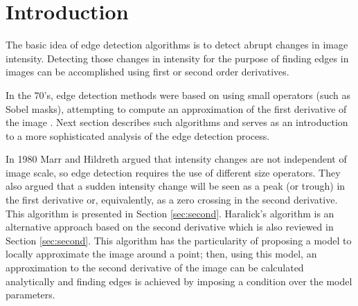 \documentclass{ipol}
\numberwithin{equation}{section}
\numberwithin{table}{section}
\begin{document}




\section{Introduction}
\label{sec:intro}

The basic idea of edge detection algorithms is to detect abrupt changes in image intensity. 
Detecting those changes in intensity for the purpose of finding edges in images 
can be accomplished using first or second order derivatives. 

In the 70's, edge detection methods were based on using small operators 
(such as Sobel masks), attempting to compute an approximation of the
first derivative of the image \cite{Gonzalez2007Digital}. Next section describes such algorithms and serves as an introduction to a more sophisticated analysis of the edge detection process.

In 1980 Marr and Hildreth \cite{AIM-518} argued that intensity changes are not independent 
of image scale, so edge detection requires the use of different size 
operators. They also argued that a sudden intensity change will be seen 
as a peak (or trough) in the first derivative or, equivalently, as a zero 
crossing in the second derivative. This algorithm is presented in Section \ref{sec:second}. 
Haralick's algorithm \cite{bb20239} is an alternative approach based on the second derivative 
which is also reviewed in Section \ref{sec:second}. This algorithm has the particularity of 
proposing a model to locally approximate the image around a point; then, using this model, 
an approximation to the second derivative of the image can be calculated analytically and 
finding edges is achieved by imposing a condition over the model parameters. 
\end{document}

